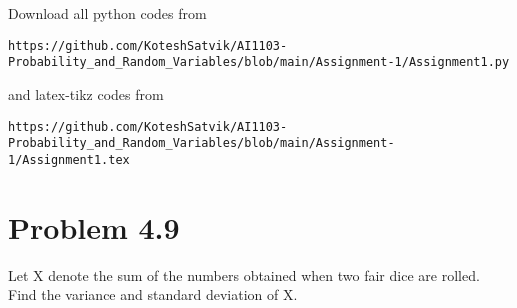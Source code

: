 \documentclass[journal,12pt,twocolumn]{IEEEtran}
\begin{document}
\author{Songa Kotesh Satvik}
\maketitle
\newpage
\bigskip
\renewcommand{\thefigure}{\theenumi}
\renewcommand{\thetable}{\theenumi}
Download all python codes from 
\begin{lstlisting}
https://github.com/KoteshSatvik/AI1103-Probability_and_Random_Variables/blob/main/Assignment-1/Assignment1.py
\end{lstlisting}
%
and latex-tikz codes from 
%
\begin{lstlisting}
https://github.com/KoteshSatvik/AI1103-Probability_and_Random_Variables/blob/main/Assignment-1/Assignment1.tex
\end{lstlisting}
\section{Problem 4.9}
Let X denote the sum of the numbers obtained when two fair dice are rolled. Find the variance and standard deviation of X.
\end{document}

